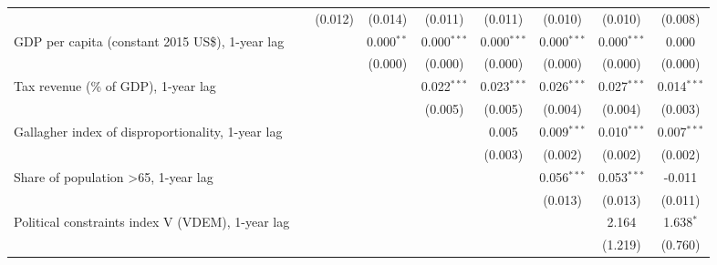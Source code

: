 \begin{table}[htbp]
\begin{tabular}{lcccccccc}
                                                                                  &               & (0.012)        & (0.014)        & (0.011)        & (0.011)        & (0.010)        & (0.010)        & (0.008)\\   
      GDP per capita (constant 2015 US\$), 1-year lag                             &               &                & 0.000$^{**}$   & 0.000$^{***}$  & 0.000$^{***}$  & 0.000$^{***}$  & 0.000$^{***}$  & 0.000\\   
                                                                                  &               &                & (0.000)        & (0.000)        & (0.000)        & (0.000)        & (0.000)        & (0.000)\\   
      Tax revenue (\% of GDP), 1-year lag                                         &               &                &                & 0.022$^{***}$  & 0.023$^{***}$  & 0.026$^{***}$  & 0.027$^{***}$  & 0.014$^{***}$\\   
                                                                                  &               &                &                & (0.005)        & (0.005)        & (0.004)        & (0.004)        & (0.003)\\   
      Gallagher index of disproportionality, 1-year lag                           &               &                &                &                & 0.005          & 0.009$^{***}$  & 0.010$^{***}$  & 0.007$^{***}$\\   
                                                                                  &               &                &                &                & (0.003)        & (0.002)        & (0.002)        & (0.002)\\   
      Share of population >65, 1-year lag                                         &               &                &                &                &                & 0.056$^{***}$  & 0.053$^{***}$  & -0.011\\   
                                                                                  &               &                &                &                &                & (0.013)        & (0.013)        & (0.011)\\   
      Political constraints index V (VDEM), 1-year lag                            &               &                &                &                &                &                & 2.164          & 1.638$^{*}$\\   
                                                                                  &               &                &                &                &                &                & (1.219)        & (0.760)\\   

\end{tabular}
\end{table}
